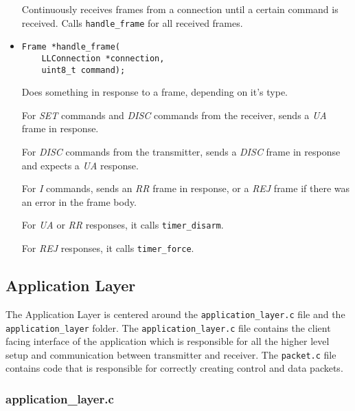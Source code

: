 \documentclass[11pt,a4paper,twocolumn]{article}
\begin{document}
\begin{itemize}
          Continuously receives frames from a connection until a certain command is received.
          Calls \lstinline{handle_frame} for all received frames.

    \item \begin{lstlisting}
Frame *handle_frame(
    LLConnection *connection, 
    uint8_t command);
    \end{lstlisting}

          Does something in response to a frame, depending on it's type.

          For \textit{SET} commands and \textit{DISC} commands from the receiver, sends a \textit{UA} frame in response.

          For \textit{DISC} commands from the transmitter, sends a \textit{DISC} frame in response and expects a \textit{UA} response.

          For \textit{I} commands, sends an \textit{RR} frame in response, or a \textit{REJ} frame if there was an error in the frame body.

          For \textit{UA} or \textit{RR} responses, it calls \lstinline{timer_disarm}.

          For \textit{REJ} responses, it calls \lstinline{timer_force}.

\end{itemize}

\subsection{Application Layer}

The Application Layer is centered around the \lstinline{application_layer.c} file and the \lstinline{application_layer} folder.
The \lstinline{application_layer.c} file contains the client facing interface of the application which is responsible for all the higher level setup and communication between transmitter and receiver.
The \lstinline{packet.c} file contains code that is responsible for correctly creating control and data packets.

\subsubsection{application\_layer.c}
\end{document}
